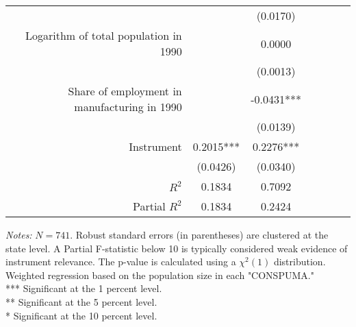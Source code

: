 \begin{frame}
\begin{table}[ht]
{\begin{tabular}{rcccccc}
                                                                              &                 & \small(0.0170)  \\
                Logarithm of total population in 1990                         &                 & 0.0000          \\
                                                                              &                 & \small(0.0013)  \\
                Share of employment in manufacturing in 1990                  &                 & -0.0431***      \\
                                                                              &                 & \small(0.0139)  \\
                Instrument                                                    & 0.2015***       & 0.2276***       \\
                                                                              & \small(0.0426)  & \small(0.0340)  \\
                \cmidrule(lr){1-1} \cmidrule(lr){2-3}
                $R^2$                                                         & 0.1834          & 0.7092          \\
                Partial $R^2$                                                 & 0.1834          & 0.2424          \\
                \bottomrule
            \end{tabular}
        }
        \vspace{0.2cm}
        
        \begin{minipage}{\linewidth}
            \tiny
            \textit{Notes:} $N = 741$. Robust standard errors (in parentheses) are clustered at the state level. A Partial F-statistic below 10 is typically considered weak evidence of instrument relevance. The p-value is calculated using a $\chi^2(1)$ distribution. Weighted regression based on the population size in each "CONSPUMA."\\
            *** Significant at the 1 percent level. \\
            ** Significant at the 5 percent level. \\
            * Significant at the 10 percent level.
        \end{minipage}
    \end{table}


\end{frame}

